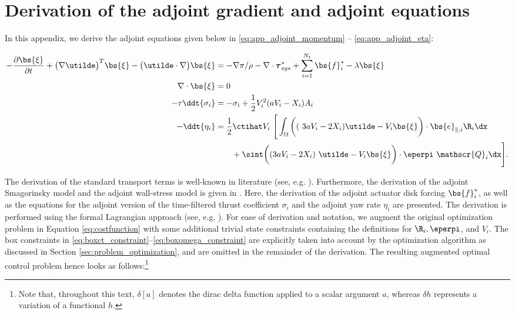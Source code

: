 \chapter{Derivation of the adjoint gradient and adjoint equations}\label{ch:app_adj_der}

In this appendix, we derive the adjoint equations given below in \eqref{eq:app_adjoint_momentum} -- \eqref{eq:app_adjoint_eta}:  

{\footnotesize
\begin{align}
- \frac{\partial \bs{\xi}}{\partial t} + \big( \nabla \utilde \big)^T \bs{\xi} - \big( \utilde \cdot \nabla \big) \bs{\xi} &= - \nabla \pi / \rho - \nabla \cdot \boldsymbol{\tau}^*_{sgs} + \sum_{i=1}^{N_t} \bs{f}^*_i - \lambda \bs{\xi} \label{eq:app_adjoint_momentum}\\
\nabla \cdot \bs{\xi} &= 0 \label{eq:app_adjoint_continuity}\\
-\tau \ddt{\sigma_i} &= -\sigma_i + \frac{1}{2} V_i^2  (a V_i - X_i) A_i \label{eq:app_adjoint_sigma}\\
- \ddt{\eta_i} &= \frac{1}{2} \ctihat V_i ~ \Bigg[ \int_{\Omega} \bigg((~3a V_i - 2 X_i ) \utilde - V_i \bs{\xi} 
\bigg) \cdot \bs{e}_{\parallel,i} \R_i \dx \nonumber \\
& \qquad  + \sint \bigg( (3a V_i - 2 X_i )~\utilde - V_i \bs{\xi} \bigg) \cdot \eperpi ~ \mathscr{Q}_i  \dx \Bigg] \label{eq:app_adjoint_eta}.
\end{align}
}

The derivation of the standard transport terms is well-known in literature (see, e.g. \citealp{choi1999instantaneous, bewley2001dns}).
Furthermore, the derivation of the adjoint Smagorinsky model and the adjoint wall-stress model is given in \cite{goit2015optimal}. Here, the derivation of the adjoint actuator disk forcing $\bs{f}_i^*$, as well as the equations for the adjoint version of the time-filtered thrust coefficient $\sigma_i$ and the adjoint yaw rate $\eta_i$ are presented. The derivation is performed using the formal Lagrangian approach (see, e.g. \citealp{borzinschulz, troltzsch}). For ease of derivation and notation, we augment the original optimization problem in Equation \eqref{eq:costfunction} with some additional trivial state constraints containing the definitions for $\R_i, \eperpi$, and $V_i$. The box constraints in \eqref{eq:boxct_constraint}--\eqref{eq:boxomega_constraint} are explicitly taken into account by the optimization algorithm as discussed in Section \ref{sec:problem_optimization}, and are omitted in the remainder of the derivation. The resulting augmented optimal control problem hence looks as follows:\footnote{Note that, throughout this text, $\delta [ a ]$ denotes the dirac delta function applied to a scalar argument $a$, whereas $\delta h$ represents a variation of a functional $h$. }

